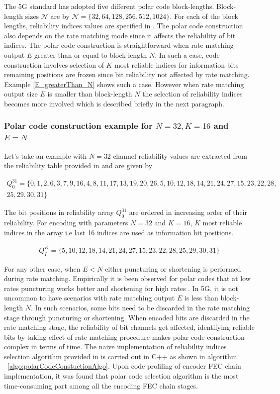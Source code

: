 The 5G standard has adopted five different polar code block-lengths. Block-length sizes $\mathcal{N}$ are by $\mathcal{N} = \{32,64,128,256,512,1024\}$.
For each of the block lengths, reliability indices values are specified in \cite{3gpp.38.212}. The polar code construction also depends on the rate matching mode since it affects the reliability of bit indices. The polar code construction is straightforward when rate matching output $E$ greater than or equal to block-length $N$. In such a case, code construction involves selection of $K$ most reliable indices for information bits remaining positions are frozen since bit reliability not affected by rate matching. Example  \ref{E_greaterThan_N} shows such a case. However when rate matching output size $E$ is smaller than block-length $N$ the selection of reliability indices becomes more involved which is described briefly in the next paragraph.

\subsubsection*{Polar code construction example for $N = 32, K = 16$ and $E = N$} \label{E_greaterThan_N}
Let's take an example with $N = 32$ channel reliability values are extracted from the reliability table provided in \cite{3gpp.38.212} and are given by

\begin{eqnarray*}
Q_{0}^{31} = \{ 0, 1, 2, 6, 3, 7, 9, 16,4, 8, 11, 17, 13, 19, 20, 26, 5, 10, 12, 18, 14, 21, 24, 27, 15, 23, 22, 28,\\
25, 29, 30, 31 \}
\end{eqnarray*}

The bit positions in reliability array $Q_{0}^{31}$ are ordered in increasing order of their reliability. For encoding with parameters $N = 32$ and $K = 16$, $K$ most reliable indices in the array i.e last 16 indices are used as information bit positions. 

\begin{eqnarray*}
	Q_{\textit{I}}^{\textit{K}} =  \{5, 10, 12, 18, 14, 21, 24, 27, 15, 23, 22, 28,25, 29, 30, 31 \}
\end{eqnarray*} 

For any other case, when $E < N$ either puncturing or shortening is performed during rate matching. Empirically it is been observed for polar codes that at low rates puncturing works better and shortening for high rates \cite{lowcomplexityPuncShorteng}. In 5G, it is not uncommon to have scenarios with rate matching output $E$ is less than block-length $N$. In such scenarios, some bits need to be discarded in the rate matching stage through puncturing or shortening. When encoded bits are discarded in the rate matching stage, the reliability of bit channels get affected, identifying reliable bits by taking effect of rate matching procedure makes polar code construction complex in terms of time. The naive implementation of reliability indices selection algorithm provided in \cite{3gpp.38.212} is carried out in C++ as shown in algorithm ~\ref{algo:polarCodeConstuctionAlgo}. Upon code profiling of encoder FEC chain implementation, it was found that polar code selection algorithm is the most time-consuming part among all the encoding FEC chain stages.

